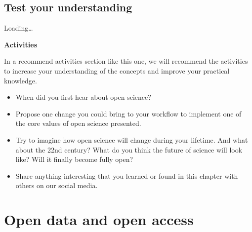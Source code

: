 \documentclass[
]{book}
\begin{document}
\hypertarget{test-your-understanding}{%
\section{Test your understanding}\label{test-your-understanding}}

Loading\ldots{}

\textbf{Activities}

In a recommend activities section like this one, we will recommend the activities to increase your understanding of the concepts and improve your practical knowledge.

\begin{itemize}
\item
  When did you first hear about open science?
\item
  Propose one change you could bring to your workflow to implement one of the core values of open science presented.
\item
  Try to imagine how open science will change during your lifetime. And what about the 22nd century? What do you think the future of science will look like? Will it finally become fully open?
\item
  Share anything interesting that you learned or found in this chapter with others on our social media.
\end{itemize}

\hypertarget{open-data-and-open-access}{%
\chapter{Open data and open access}\label{open-data-and-open-access}}
\end{document}
